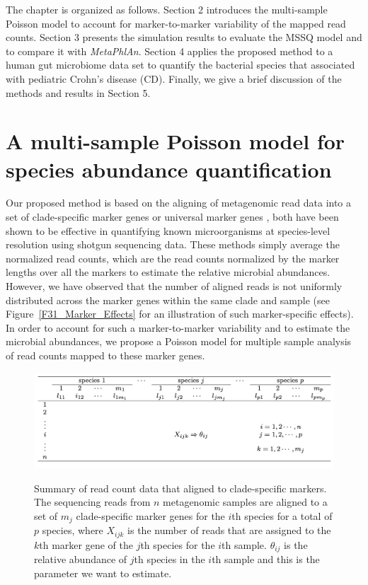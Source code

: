 The chapter is organized as follows. Section 2 introduces the multi-sample  Poisson model to account for marker-to-marker variability of the mapped read counts. Section 3 presents the simulation results to evaluate the MSSQ model and to compare it with {\it MetaPhlAn}. Section 4 applies the proposed method to a human gut microbiome data set to quantify the bacterial species  that associated with pediatric Crohn's disease (CD). Finally, we give a brief discussion of the methods and results in Section 5.


\section{A multi-sample Poisson model for species abundance quantification}


Our proposed method is based on the aligning of metagenomic read data into a set of clade-specific marker genes \citep{segata2012metagenomic} or universal marker genes \citep{Sunagawa:2013if}, both have been shown to be effective in quantifying known microorganisms at species-level resolution using shotgun sequencing data. These methods simply average the normalized read counts, which are the read counts normalized by the marker lengths over all the markers to estimate the relative microbial abundances. However, we have observed that the number of aligned reads is not uniformly distributed across the marker genes within the same clade and sample (see Figure~\ref{F31_Marker_Effects} for an illustration of such marker-specific effects). In order to account for such a marker-to-marker variability and to estimate the microbial abundances, we propose a Poisson model for multiple sample analysis of read counts mapped to these marker genes.

\begin{figure}[htb]
\centering
{\includegraphics[scale=0.5,trim=0 0 0 0,clip]{Figure/F32_table.pdf}}
\caption[Summary of read count data that aligned to clade-specific markers]{Summary of read count data that aligned to clade-specific markers. The sequencing reads from $n$ metagenomic samples are aligned to a set of $m_j$ clade-specific marker genes for the $i$th species  for a total of $p$ species, where $X_{ijk}$ is  the number of reads that are assigned to the $k$th marker gene of the $j$th species for the $i$th sample.  $\theta_{ij}$ is the relative abundance of $j$th species in the $i$th sample and this is the parameter we want to estimate.}
\label{F32_table}
\end{figure}


